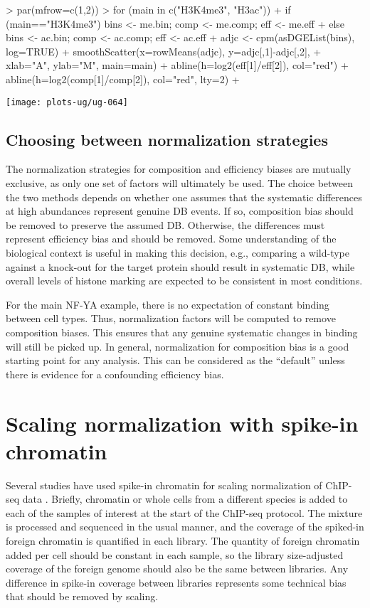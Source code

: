 \documentclass[12pt]{report}
\renewenvironment{Schunk}{\vspace{0pt}}{\vspace{0pt}}
\begin{document}
\begin{Schunk}
\begin{Sinput}
> par(mfrow=c(1,2))
> for (main in c("H3K4me3", "H3ac")) { 
+     if (main=="H3K4me3") { bins <- me.bin; comp <- me.comp; eff <- me.eff }
+     else { bins <- ac.bin; comp <- ac.comp; eff <- ac.eff }
+     adjc <- cpm(asDGEList(bins), log=TRUE)
+     smoothScatter(x=rowMeans(adjc), y=adjc[,1]-adjc[,2], 
+         xlab="A", ylab="M", main=main)
+     abline(h=log2(eff[1]/eff[2]), col="red")
+     abline(h=log2(comp[1]/comp[2]), col="red", lty=2)
+ }
\end{Sinput}
\end{Schunk}

\begin{center}
\texttt{[image: plots-ug/ug-064]}
\end{center}

\subsection{Choosing between normalization strategies}
The normalization strategies for composition and efficiency biases are mutually exclusive, as only one set of factors will ultimately be used.
The choice between the two methods depends on whether one assumes that the systematic differences at high abundances represent genuine DB events.
If so, composition bias should be removed to preserve the assumed DB.
Otherwise, the differences must represent efficiency bias and should be removed.
Some understanding of the biological context is useful in making this decision, e.g., comparing a wild-type against a knock-out for the target protein should result in systematic DB, while overall levels of histone marking are expected to be consistent in most conditions.

For the main NF-YA example, there is no expectation of constant binding between cell types.
Thus, normalization factors will be computed to remove composition biases.
This ensures that any genuine systematic changes in binding will still be picked up.
In general, normalization for composition bias is a good starting point for any analysis.
This can be considered as the ``default'' unless there is evidence for a confounding efficiency bias.

\section{Scaling normalization with spike-in chromatin}
Several studies have used spike-in chromatin for scaling normalization of ChIP-seq data \citep{bonhoure2014quantifying,orlando2014quantitative}.
Briefly, chromatin or whole cells from a different species is added to each of the samples of interest at the start of the ChIP-seq protocol.
The mixture is processed and sequenced in the usual manner, and the coverage of the spiked-in foreign chromatin is quantified in each library.
The quantity of foreign chromatin added per cell should be constant in each sample, so the library size-adjusted coverage of the foreign genome should also be the same between libraries.
Any difference in spike-in coverage between libraries represents some technical bias that should be removed by scaling.
\end{document}
